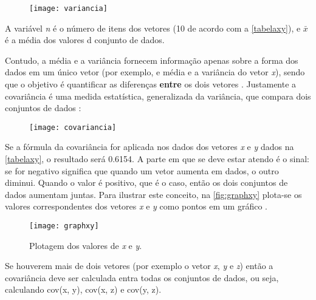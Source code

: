\begin{figure}[h]
	\centering
	\texttt{[image: variancia]}
	\label{fig:variancia}
\end{figure}

A variável \textit{n} é o número de itens dos vetores (10 de acordo com a \autoref{tabelaxy}), e $\bar{x}$  é a média dos valores d conjunto de dados.

Contudo, a média e a variância fornecem informação apenas sobre a forma dos dados em um único vetor (por exemplo, e média e a variância do vetor \textit{x}), sendo que o objetivo é quantificar as diferenças \textbf{entre} os dois vetores \cite{drmathew_java_programming}.  Justamente a covariância é uma medida estatística, generalizada da variância, que compara dois conjuntos de dados \cite{drmathew_java_programming}:

\begin{figure}[h]
	\centering
	\texttt{[image: covariancia]}
	\label{fig:covariancia}
\end{figure}

Se a fórmula da covariância for aplicada nos dados dos vetores \textit{x} e \textit{y} dados na \autoref{tabelaxy}, o resultado será 0.6154. A parte em que se deve estar atendo é o sinal: se for negativo significa que quando um vetor aumenta em dados, o outro diminui. Quando o valor é positivo, que é o caso, então os dois conjuntos de dados aumentam juntas. Para ilustrar este conceito, na \autoref{fig:graphxy} plota-se os valores correspondentes dos vetores \textit{x} e \textit{y} como pontos em um gráfico \cite{drmathew_java_programming}.


\begin{figure}[h]
	\centering
	\texttt{[image: graphxy]}
	\caption{Plotagem dos valores de \textit{x} e \textit{y}.}
	\label{fig:graphxy}
\end{figure}

Se houverem mais de dois vetores (por exemplo o vetor \textit{x}, \textit{y} e \textit{z}) então a covariância deve ser calculada entra todas os conjuntos de dados, ou seja, calculando cov(x, y), cov(x, z) e cov(y, z). 

